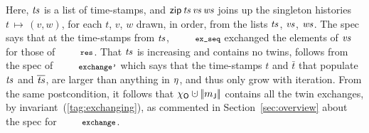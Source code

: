 %
Here, $\mathit{ts}$ is a list of time-stamps, and
$\mathsf{zip}\,\mathit{ts}\,\mathit{vs}\,\mathit{ws}$ joins up the singleton histories
$t\,{\mapsto}\,(v, w)$, for each $t$, $v$, $w$ drawn, in order, from
the lists $\mathit{ts}$, $\mathit{vs}$, $\mathit{ws}$.
%
%
The spec says that at the time-stamps from $\mathit{ts}$, $\esc{ex\_seq}$
exchanged the elements of $\mathit{vs}$ for those of $\esc{res}$. That $\mathit{ts}$
is increasing and contains no twins, follows from the spec of
$\esc{exchange'}$ which says that the time-stamps $t$ and $\bar t$
that populate $\mathit{ts}$ and $\overline{\mathit{ts}}$, are larger than anything in
$\eta$, and thus only grow with iteration.
%
%
From the same postcondition, it follows that $\histo \hunion
\mygather{\pending}$ contains all the twin exchanges, by
invariant~(\ref{tag:exchanging}), as commented in
Section~\ref{sec:overview} about the spec for $\esc{exchange}$.

